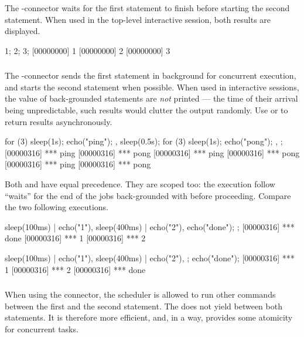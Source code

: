 \subsubsection{\samp{;}}

The \samp{;}-connector waits for the first statement to finish before
starting the second statement.  When used in the top-level interactive
session, both results are displayed.

\begin{urbiscript}
1; 2; 3;
[00000000] 1
[00000000] 2
[00000000] 3
\end{urbiscript}

\subsubsection{\samp{,}}

The \samp{,}-connector sends the first statement in background for
concurrent execution, and starts the second statement when possible.
When used in interactive sessions, the value of back-grounded
statements are \emph{not} printed --- the time of their arrival being
unpredictable, such results would clutter the output randomly.  Use
 or  to return results
asynchronously.

\begin{urbiscript}
{
  for (3)
  {
    sleep(1s);
    echo("ping");
  },
  sleep(0.5s);
  for (3)
  {
    sleep(1s);
    echo("pong");
  },
};
[00000316] *** ping
[00000316] *** pong
[00000316] *** ping
[00000316] *** pong
[00000316] *** ping
[00000316] *** pong
\end{urbiscript}

Both \samp{;} and \samp{,} have equal precedence.  They are scoped
too: the execution follow ``waits'' for the end of the jobs
back-grounded with \samp{,} before proceeding.  Compare the two
following executions.

\begin{urbiscript}
{
  sleep(100ms) | echo("1"),
  sleep(400ms) | echo("2"),
  echo("done");
};
[00000316] *** done
[00000316] *** 1
[00000316] *** 2
\end{urbiscript}

\begin{urbiscript}
{
  sleep(100ms) | echo("1"),
  sleep(400ms) | echo("2"),
};
echo("done");
[00000316] *** 1
[00000316] *** 2
[00000316] *** done
\end{urbiscript}


\subsubsection{\samp{|}}
When using the \samp{;} connector, the scheduler is allowed to run
other commands between the first and the second statement.  The
\samp{|} does not yield between both statements.  It is therefore more
efficient, and, in a way, provides some atomicity for concurrent tasks.

